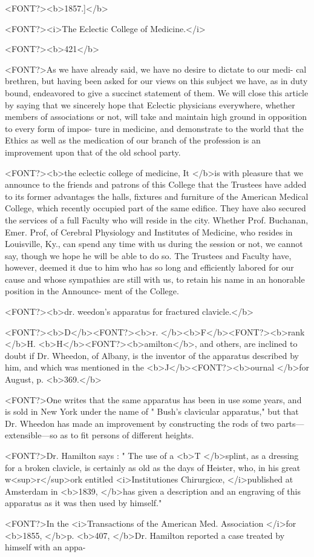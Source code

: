 <FONT?><b>1857.]</b>

<FONT?><i>The Eclectic College of Medicine.</i>

<FONT?><b>421</b>

<FONT?>As we have already said, we have no desire to dictate to our medi-
cal brethren, but having been asked for our views on this subject we
have, as in duty bound, endeavored to give a succinct statement of them.
We will close this article by saying that we sincerely hope that Eclectic
physicians everywhere, whether members of associations or not, will
take and maintain high ground in opposition to every form of impos-
ture in medicine, and demonstrate to the world that the Ethics as well
as the medication of our branch of the profession is an improvement
upon that of the old school party.

<FONT?><b>the eclectic college of medicine,
It </b>is with pleasure that we announce to the friends and patrons of this
College that the Trustees have added to its former advantages the halls,
fixtures and furniture of the American Medical College, which recently
occupied part of the same edifice. They have also secured the services
of a full Faculty who will reside in the city. Whether Prof. Buchanan,
Emer. Prof, of Cerebral Physiology and Institutes of Medicine, who
resides in Louisville, Ky., can spend any time with us during the session
or not, we cannot say, though we hope he will be able to do so. The
Trustees and Faculty have, however, deemed it due to him who has so
long and efficiently labored for our cause and whose sympathies are still
with us, to retain his name in an honorable position in the Announce-
ment of the College.

<FONT?><b>dr. weedon's apparatus for fractured clavicle.</b>

<FONT?><b>D</b><FONT?><b>r. </b><b>F</b><FONT?><b>rank </b>H. <b>H</b><FONT?><b>amilton</b>, and others, are inclined to doubt if Dr.
Wheedon, of Albany, is the inventor of the apparatus described by him,
and which was mentioned in the <b>J</b><FONT?><b>ournal </b>for August, p. <b>369.</b>

<FONT?>One writes that the same apparatus has been in use some years, and
is sold in New York under the name of " Bush's clavicular apparatus,"
but that Dr. Wheedon has made an improvement by constructing the
rods of two parts---extensible---so as to fit persons of different heights.

<FONT?>Dr. Hamilton says : " The use of a <b>T </b>splint, as a dressing for a broken
clavicle, is certainly as old as the days of Heister, who, in his great w<sup>r</sup>ork
entitled <i>Institutiones Chirurgicœ, </i>published at Amsterdam in <b>1839, </b>has
given a description and an engraving of this apparatus as it was then
used by himself."

<FONT?>In the <i>Transactions of the American Med. Association </i>for <b>1855,
</b>p. <b>407, </b>Dr. Hamilton reported a case treated by himself with an appa-\endinput
